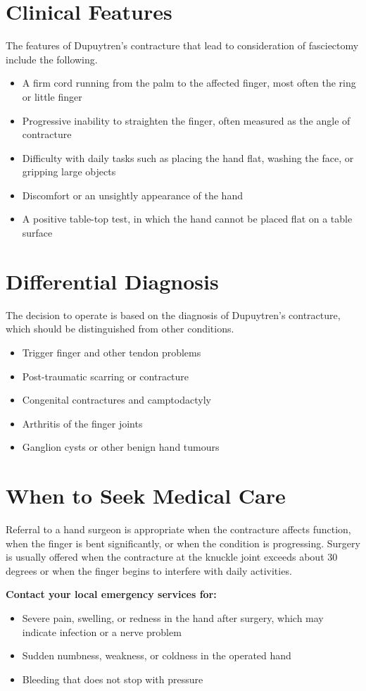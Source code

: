 \section*{Clinical Features}
The features of Dupuytren's contracture that lead to consideration of fasciectomy include the following.
\begin{itemize}
    \item A firm cord running from the palm to the affected finger, most often the ring or little finger
    \item Progressive inability to straighten the finger, often measured as the angle of contracture
    \item Difficulty with daily tasks such as placing the hand flat, washing the face, or gripping large objects
    \item Discomfort or an unsightly appearance of the hand
    \item A positive table-top test, in which the hand cannot be placed flat on a table surface
\end{itemize}

\section*{Differential Diagnosis}
The decision to operate is based on the diagnosis of Dupuytren's contracture, which should be distinguished from other conditions.
\begin{itemize}
    \item Trigger finger and other tendon problems
    \item Post-traumatic scarring or contracture
    \item Congenital contractures and camptodactyly
    \item Arthritis of the finger joints
    \item Ganglion cysts or other benign hand tumours
\end{itemize}

\section*{When to Seek Medical Care}
Referral to a hand surgeon is appropriate when the contracture affects function, when the finger is bent significantly, or when the condition is progressing. Surgery is usually offered when the contracture at the knuckle joint exceeds about 30 degrees or when the finger begins to interfere with daily activities.

\textbf{Contact your local emergency services for:}
\begin{itemize}
    \item Severe pain, swelling, or redness in the hand after surgery, which may indicate infection or a nerve problem
    \item Sudden numbness, weakness, or coldness in the operated hand
    \item Bleeding that does not stop with pressure
\end{itemize}

